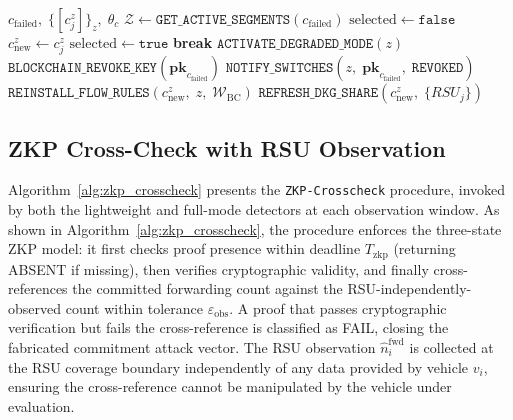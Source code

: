 \documentclass[12pt, a4paper]{report}
\begin{document}
\begin{algorithm}[H]
\caption{Controller Failover and Key Revocation
(\texttt{Controller-Failover})}
\begin{algorithmic}[1]
\small
{}
  {$c_{\text{failed}},\;
    \{[c_j^z]\}_z,\;
    \theta_c$}
  \State $\mathcal{Z} \gets
    \texttt{GET\_ACTIVE\_SEGMENTS}(c_{\text{failed}})$
    \State $\mathrm{selected} \gets \texttt{false}$
        \State $c_{\text{new}}^z \gets c_j^z$
        \State $\mathrm{selected} \gets \texttt{true}$
        \State \textbf{break}
      \EndIf
    \EndFor
      \State $\texttt{ACTIVATE\_DEGRADED\_MODE}(z)$
    \Else
      \State $\texttt{BLOCKCHAIN\_REVOKE\_KEY}
        (\mathbf{pk}_{c_{\text{failed}}})$
      \State $\texttt{NOTIFY\_SWITCHES}
        (z,\;
        \mathbf{pk}_{c_{\text{failed}}},\;
        \texttt{REVOKED})$
      \State $\texttt{REINSTALL\_FLOW\_RULES}
        (c_{\text{new}}^z,\; z,\;
        \mathcal{W}_{\text{BC}})$
      \State $\texttt{REFRESH\_DKG\_SHARE}
        (c_{\text{new}}^z,\;
        \{RSU_j\})$
    \EndIf
  \EndFor
\EndProcedure
\end{algorithmic}
\label{alg:controller_failover}
\end{algorithm}

\subsection{ZKP Cross-Check with RSU Observation}
\label{sec:alg_zkp_crosscheck}

Algorithm~\ref{alg:zkp_crosscheck} presents the
\texttt{ZKP-Crosscheck} procedure, invoked by both the lightweight
and full-mode detectors at each observation window. As shown in
Algorithm~\ref{alg:zkp_crosscheck}, the procedure enforces the
three-state ZKP model: it first checks proof presence within
deadline $T_{\text{zkp}}$ (returning ABSENT if missing), then
verifies cryptographic validity, and finally cross-references the
committed forwarding count against the RSU-independently-observed
count within tolerance $\varepsilon_{\text{obs}}$. A proof that
passes cryptographic verification but fails the cross-reference
is classified as FAIL, closing the fabricated commitment attack
vector. The RSU observation $\widehat{n}_i^{\text{fwd}}$ is
collected at the RSU coverage boundary independently of any data
provided by vehicle $v_i$, ensuring the cross-reference cannot
be manipulated by the vehicle under evaluation.
\end{document}
